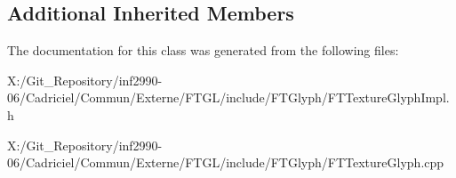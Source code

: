 \subsection*{Additional Inherited Members}


The documentation for this class was generated from the following files\-:\begin{DoxyCompactItemize}
\item 
X\-:/\-Git\-\_\-\-Repository/inf2990-\/06/\-Cadriciel/\-Commun/\-Externe/\-F\-T\-G\-L/include/\-F\-T\-Glyph/F\-T\-Texture\-Glyph\-Impl.\-h\item 
X\-:/\-Git\-\_\-\-Repository/inf2990-\/06/\-Cadriciel/\-Commun/\-Externe/\-F\-T\-G\-L/include/\-F\-T\-Glyph/F\-T\-Texture\-Glyph.\-cpp\end{DoxyCompactItemize}
